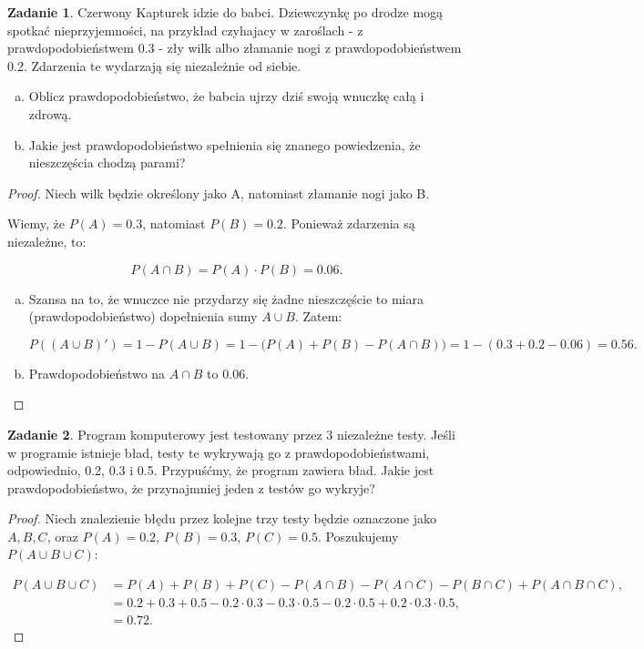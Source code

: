 \documentclass[11pt]{article}
\theoremstyle{definition}
\newtheorem{zadanie}{Zadanie}
\numberwithin{zadanie}{section}
\begin{document}
\begin{zadanie}
    Czerwony Kapturek idzie do babci. Dziewczynkę po drodze mogą spotkać nieprzyjemności, na przykład czyhajacy w zaroślach
    - z prawdopodobieństwem 0.3 - zły wilk albo złamanie nogi z prawdopodobieństwem 0.2. Zdarzenia te wydarzają się niezależnie od siebie.

    \begin{enumerate}[a)]
        \item Oblicz prawdopodobieństwo, że babcia ujrzy dziś swoją wnuczkę całą i zdrową.
        \item Jakie jest prawdopodobieństwo spełnienia się znanego powiedzenia, że nieszczęścia chodzą parami?
    \end{enumerate}
\end{zadanie}
\begin{proof}
    Niech wilk będzie określony jako A, natomiast złamanie nogi jako B.

    Wiemy, że $P(A) = 0.3$, natomiast $P(B) = 0.2$. Ponieważ zdarzenia są niezależne, to:

    $$P(A\cap B) = P(A)\cdot P(B) = 0.06.$$
    \begin{enumerate}[a)]
        \item Szansa na to, że wnuczce nie przydarzy się żadne nieszczęście to miara (prawdopodobieństwo) dopełnienia sumy $A\cup B$. Zatem:

              $$P((A\cup B)') = 1 - P(A\cup B) = 1 - \big(P(A) + P(B) - P(A\cap B)\big) = 1 - (0.3+0.2-0.06) = 0.56.$$

        \item Prawdopodobieństwo na $A\cap B$ to $0.06$.
    \end{enumerate}
\end{proof}

\begin{zadanie}
    Program komputerowy jest testowany przez 3 niezależne testy. Jeśli w programie istnieje bład,
    testy te wykrywają go z prawdopodobieństwami, odpowiednio, 0.2, 0.3 i 0.5. Przypuśćmy, że program zawiera bład.
    Jakie jest prawdopodobieństwo, że przynajmniej jeden z testów go wykryje?
\end{zadanie}

\begin{proof}
    Niech znalezienie błędu przez kolejne trzy testy będzie oznaczone jako $A, B, C$, oraz $P(A) = 0.2$, $P(B) = 0.3$, $P(C) = 0.5$. Poszukujemy $P(A\cup B\cup C)$:

    \begin{align*}
        P(A\cup B\cup C) & = P(A) + P(B) + P(C) - P(A\cap B) - P(A\cap C) - P(B\cap C) + P(A\cap B\cap C), \\
                         & = 0.2+0.3+0.5 - 0.2\cdot0.3 - 0.3\cdot0.5-0.2\cdot0.5 + 0.2\cdot0.3\cdot0.5,    \\
                         & = 0.72.
    \end{align*}
\end{proof}
\end{document}
